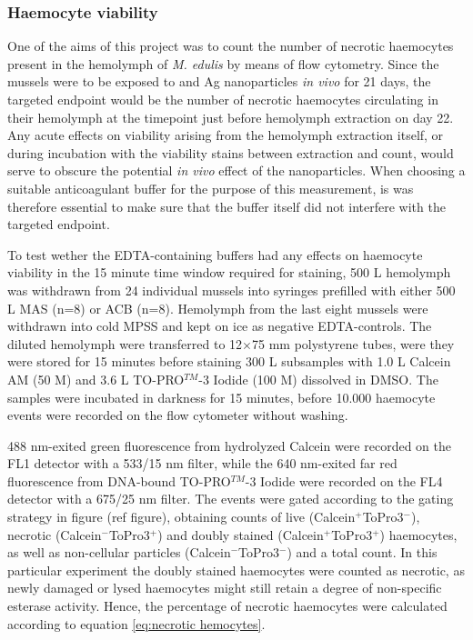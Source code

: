 \subsubsection{Haemocyte viability}
One of the aims of this project was to count the number of necrotic haemocytes present in the hemolymph of \emph{M. edulis} by means of flow cytometry. Since the mussels were to be exposed to  and Ag nanoparticles \emph{in vivo} for 21 days, the targeted endpoint would be the number of necrotic haemocytes circulating in their hemolymph at the timepoint just before hemolymph extraction on day 22. Any acute effects on viability arising from the hemolymph extraction itself, or during incubation with the viability stains between extraction and count, would serve to obscure the potential \emph{in vivo} effect of the nanoparticles. When choosing a suitable anticoagulant buffer for the purpose of this measurement, is was therefore essential to make sure that the buffer itself did not interfere with the targeted endpoint.

To test wether the EDTA-containing buffers had any effects on haemocyte viability in the 15 minute time window required for staining, 500 \micro L hemolymph was withdrawn from 24 individual mussels into syringes prefilled with either 500 \micro L MAS (n=8) or ACB (n=8). Hemolymph from the last eight mussels were withdrawn into cold MPSS and kept on ice as negative EDTA-controls. The diluted hemolymph were transferred to 12$\times$75 mm polystyrene tubes, were they were stored for 15 minutes before staining 300 \micro L subsamples with 1.0 \micro L Calcein AM (50 \micro M) and 3.6 \micro L TO-PRO$^{TM}$-3 Iodide (100 \micro M) dissolved in DMSO. The samples were incubated in darkness for 15 minutes, before 10.000 haemocyte events were recorded on the flow cytometer without washing.

488 nm-exited green fluorescence from hydrolyzed Calcein were recorded on the FL1 detector with a 533/15 nm filter, while the 640 nm-exited far red fluorescence from DNA-bound TO-PRO$^{TM}$-3 Iodide were recorded on the FL4 detector with a 675/25 nm filter. The events were gated according to the gating strategy in figure (ref figure), obtaining counts of live (Calcein$^{+}$ToPro3$^{-}$), necrotic (Calcein$^{-}$ToPro3$^{+}$) and doubly stained (Calcein$^{+}$ToPro3$^{+}$) haemocytes, as well as non-cellular particles (Calcein$^{-}$ToPro3$^{-}$) and a total count. In this particular experiment the doubly stained haemocytes were counted as necrotic, as newly damaged or lysed haemocytes might still retain a degree of non-specific esterase activity. Hence, the percentage of necrotic haemocytes were calculated according to equation \ref{eq:necrotic hemocytes}.


